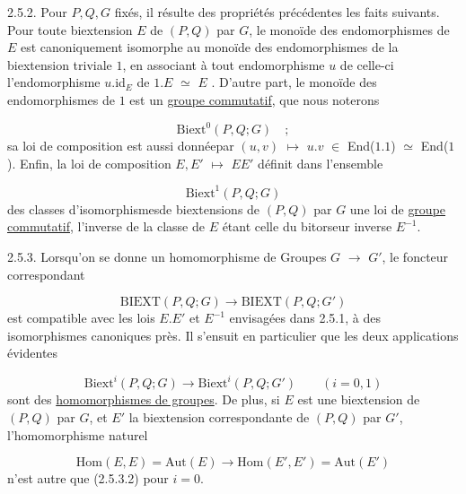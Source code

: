 
2.5.2. Pour $P, Q, G$ fixés, il résulte des propriétés précédentes les faits suivants. Pour toute biextension $E$ de $(P,Q)$ par $G$, le monoïde des endomorphismes de $E$ est canoniquement isomorphe au monoïde des endomorphismes de la biextension triviale \underline{$1$}, en associant à tout endomorphisme $u$ de celle-ci l'endomorphisme $u$.id$_{E}$ de \underline{$1$}.$E$ $\simeq$ $E$ . D'autre part, le monoïde des endomorphismes de \underline{$1$} est un \underline{groupe commutatif}, que nous noterons

\begin{equation}\tag{2.5.2.1}
\mathrm{Biext}^{0}(P,Q;G) \quad ;
\end{equation}
sa loi de composition est aussi donnéepar $(u,v)$ $\longmapsto$ $u.v$ $\in$ End(\underline{$1$}.\underline{$1$}) $\simeq$ End(\underline{$1$}). Enfin, la loi de composition $E,E'$ $\longmapsto$ $EE'$ définit dans l'ensemble

\begin{equation}\tag{2.5.2.2}
\mathrm{Biext}^{1}(P,Q;G)
\end{equation}
des classes d'isomorphismesde biextensions de $(P,Q)$ par $G$ une loi de \underline{groupe commutatif}, l'inverse de la classe de $E$ étant celle du bitorseur inverse $E^{-1}$.

2.5.3. Lorsqu'on se donne un homomorphisme de Groupes $G$ $\longrightarrow$ $G'$, le foncteur correspondant

\begin{equation}\tag{2.5.3.1}
\mathrm{BIEXT}(P,Q;G) \longrightarrow \mathrm{BIEXT}(P,Q;G')
\end{equation}
est compatible avec les lois $E.E'$ et $E^{-1}$ envisagées dans 2.5.1, à des isomorphismes canoniques près. Il s'ensuit en particulier que les deux applications évidentes

\begin{equation}\tag{2.5.3.2}
\mathrm{Biext}^{i}(P,Q;G) \longrightarrow \mathrm{Biext}^{i}(P,Q;G') \qquad (i=0,1)
\end{equation}
sont des \underline{homomorphismes de groupes}. De plus, si $E$ est une biextension de $(P,Q)$ par $G$, et $E'$ la biextension correspondante de $(P,Q)$ par $G'$, l'homomorphisme naturel

\begin{equation}\tag{2.5.3.3}
\mathrm{Hom}(E,E) = \mathrm{Aut}(E) \longrightarrow \mathrm{Hom}(E',E') = \mathrm{Aut}(E')
\end{equation}
n'est autre que (2.5.3.2) pour $i = 0$.

